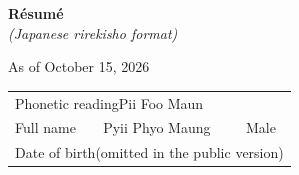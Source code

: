\documentclass[a4paper,10pt]{article}
\newcommand{\fieldlabel}[1]{\small\textsf{#1}}
\begin{document}
\noindent
\begin{minipage}[t]{0.65\linewidth}
  {\Huge\bfseries R\hspace{0.6em}é\hspace{0.6em}s\hspace{0.6em}u\hspace{0.6em}m\hspace{0.6em}é}\\[2pt]
  {\small\itshape (Japanese \textit{rirekisho} format)}
\end{minipage}%
\begin{minipage}[t]{0.35\linewidth}
  \raggedleft
  \vspace{1.2em}
  As of October 15, 2026
\end{minipage}

\vspace{4pt}

\noindent
\begin{minipage}[b]{0.8\linewidth}
\begin{tabular}{|m{3cm}|m{8.5cm}|m{1.6cm}|}
  \hline
  \multicolumn{3}{|l|}{\fieldlabel{Phonetic reading}\hspace{1em}\footnotesize Pii Foo Maun} \\[-0.4em]
  \fieldlabel{Full name} & {\Large Pyii Phyo Maung} & \fieldlabel{Male} \\
  \hline
  \multicolumn{3}{|l|}{\fieldlabel{Date of birth}\hspace{1em}(omitted in the public version)} \\
  \hline
\end{tabular}
\end{minipage}\hfill
\begin{minipage}[b]{3.2cm}
  \centering{}
\end{minipage}

\vspace{2pt}
\end{document}
